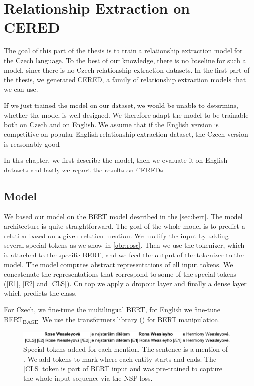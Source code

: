 \chapter{Relationship Extraction on CERED}
The goal of this part of the thesis is to train a relationship extraction model for the Czech language. To the best of our knowledge, there is no baseline for such a model, since there is no Czech relationship extraction datasets. In the first part of the thesis, we generated CERED, a family of relationship extraction models that we can use.

If we just trained the model on our dataset, we would be unable to determine, whether the model is well designed. We therefore adapt the model to be trainable both on Czech and on English. We assume that if the English version is competitive on popular English relationship extraction dataset, the Czech version is reasonably good.

In this chapter, we first describe the model, then we evaluate it on English datasets and lastly we report the results on CEREDs.

\section{Model}

We based our model on the BERT model described in the \autoref{sec:bert}. The model architecture is quite straightforward. The goal of the whole model is to predict a relation based on a given relation mention. We modify the input by adding several special tokens as we show in \autoref{obr:rose}. Then we use the tokenizer, which is attached to the specific BERT, and we feed the output of the tokenizer to the model. The model computes abstract representations of all input tokens. We concatenate the representations that correspond to some of the special tokens ([E1], [E2] and [CLS]). On top we apply a dropout layer and finally a dense layer which predicts the class. 

For Czech, we fine-tune the multilingual BERT, for English we fine-tune BERT\textsubscript{BASE}. We use the transformers library (\cite{Wolf2019HuggingFacesTS}) for BERT manipulation.



\begin{figure}[h]
\includegraphics[width = 1\textwidth]{./img/rose}
\caption{Special tokens added for each mention. The sentence is a mention of . We add tokens to mark where each entity starts and ends. The [CLS] token is part of BERT input and was pre-trained to capture the whole input sequence via the NSP loss.}
\label{obr:rose}
\end{figure}



